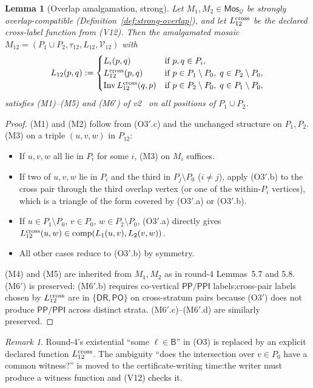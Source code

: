 \documentclass[11pt]{article}
\newtheorem{lemma}[theorem]{Lemma}
\theoremstyle{definition}
\theoremstyle{remark}
\newtheorem{remark}[theorem]{Remark}
\newcommand{\DR}{\mathsf{DR}}
\newcommand{\PO}{\mathsf{PO}}
\newcommand{\PP}{\mathsf{PP}}
\newcommand{\PPI}{\mathsf{PPI}}
\newcommand{\Base}{\mathsf{B}}
\newcommand{\Inv}{\operatorname{Inv}}
\newcommand{\comp}{\operatorname{comp}}
\newcommand{\Mos}{\mathsf{Mos}}
\newcommand{\Q}{\mathcal{Q}}
\begin{document}
\begin{lemma}[Overlap amalgamation, strong]\label{lem:overlap-v3}
Let $M_1,M_2\in\Mos_\Q$ be strongly overlap-compatible
(Definition~\ref{def:strong-overlap}), and let $L_{12}^{\rm cross}$
be the declared cross-label function from (V12).  Then the
amalgamated mosaic
$M_{12}=(P_1\cup P_2,\tau_{12},L_{12},\mathcal V_{12})$ with
\[
  L_{12}(p,q):=\begin{cases}
    L_i(p,q) & \text{if }p,q\in P_i,\\
    L_{12}^{\rm cross}(p,q) & \text{if }p\in P_1\setminus P_0,\;q\in P_2\setminus P_0,\\
    \Inv L_{12}^{\rm cross}(q,p) & \text{if }p\in P_2\setminus P_0,\;q\in P_1\setminus P_0,
  \end{cases}
\]
satisfies (M1)--(M5) and (M6$'$) of v2~\cite{V2Delta} on all
positions of $P_1\cup P_2$.
\end{lemma}

\begin{proof}
(M1) and (M2) follow from (O3$'$.c) and the unchanged structure on
$P_1, P_2$.  (M3) on a triple $(u,v,w)$ in $P_{12}$:\@
\begin{itemize}
\item If $u,v,w$ all lie in $P_i$ for some $i$, (M3) on $M_i$
suffices.
\item If two of $u,v,w$ lie in $P_i$ and the third in
$P_j\setminus P_0$ ($i\neq j$), apply (O3$'$.b) to the cross pair
through the third overlap vertex (or one of the within-$P_i$
vertices), which is a triangle of the form covered by (O3$'$.a)
or (O3$'$.b).
\item If $u\in P_1\setminus P_0$, $v\in P_0$, $w\in P_2\setminus
P_0$, (O3$'$.a) directly gives
$L_{12}^{\rm cross}(u,w)\in\comp(L_1(u,v),L_2(v,w))$.
\item All other cases reduce to (O3$'$.b) by symmetry.
\end{itemize}
(M4) and (M5) are inherited from $M_1, M_2$ as in round-4
Lemmas~5.7 and 5.8.  (M6$'$) is preserved: (M6$'$.b) requires
co-vertical $\PP/\PPI$ labels;\@ cross-pair labels chosen by
$L_{12}^{\rm cross}$ are in $\{\DR,\PO\}$ on cross-stratum pairs
because (O3$'$) does not produce $\PP/\PPI$ across distinct strata.
(M6$'$.c)--(M6$'$.d) are similarly preserved.
\end{proof}

\begin{remark}
Round-4's existential ``some $\ell\in\Base$'' in (O3) is replaced
by an explicit declared function $L_{12}^{\rm cross}$.  The
ambiguity ``does the intersection over $v\in P_0$ have a common
witness?'' is moved to the certificate-writing time:\@ the writer
must produce a witness function and (V12) checks it.
\end{remark}
\end{document}
